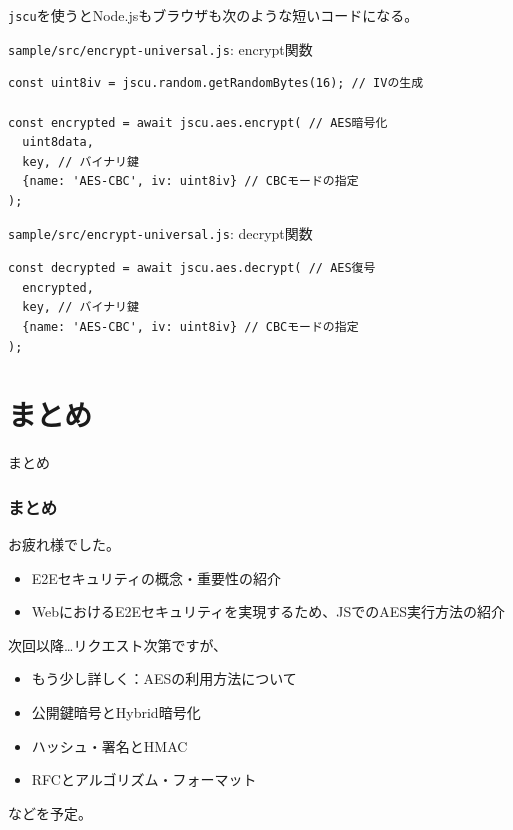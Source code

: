 \documentclass[12pt,dvipdfmx]{beamer}
\begin{document}
\begin{frame}[fragile]
\texttt{jscu}を使うとNode.jsもブラウザも次のような短いコードになる。

\begin{block}{\small \texttt{sample/src/encrypt-universal.js}: encrypt関数}
\scriptsize
\begin{verbatim}
const uint8iv = jscu.random.getRandomBytes(16); // IVの生成

const encrypted = await jscu.aes.encrypt( // AES暗号化
  uint8data,
  key, // バイナリ鍵
  {name: 'AES-CBC', iv: uint8iv} // CBCモードの指定
);
\end{verbatim}
\end{block}


\begin{block}{\small \texttt{sample/src/encrypt-universal.js}: decrypt関数}
\scriptsize
\begin{verbatim}
const decrypted = await jscu.aes.decrypt( // AES復号
  encrypted,
  key, // バイナリ鍵
  {name: 'AES-CBC', iv: uint8iv} // CBCモードの指定
);
\end{verbatim}
\end{block}

\end{frame}

\section{まとめ}
\begin{frame}
 \centering
 {\Large まとめ}
\end{frame}

\begin{frame}
\frametitle{まとめ}
お疲れ様でした。

\begin{itemize}
\item E2Eセキュリティの概念・重要性の紹介
\item WebにおけるE2Eセキュリティを実現するため、JSでのAES実行方法の紹介
\end{itemize}

\vspace{2ex}

次回以降…リクエスト次第ですが、
\begin{itemize}
\item もう少し詳しく：AESの利用方法について
\item 公開鍵暗号とHybrid暗号化
\item ハッシュ・署名とHMAC
\item RFCとアルゴリズム・フォーマット
\end{itemize}
などを予定。
\end{frame}
\end{document}
